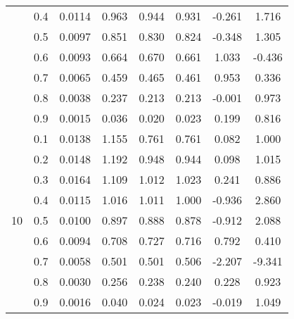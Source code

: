 \documentclass[11pt,a4paper]{report}
\begin{document}
\begin{longtable}{ | c | c || c | c | c | c | c | c | }
 & 0.4 & 0.0114 & 0.963 & 0.944 & 0.931 & -0.261 & 1.716 \\
 & 0.5 & 0.0097 & 0.851 & 0.830 & 0.824 & -0.348 & 1.305 \\
 & 0.6 & 0.0093 & 0.664 & 0.670 & 0.661 & 1.033 & -0.436 \\
 & 0.7 & 0.0065 & 0.459 & 0.465 & 0.461 & 0.953 & 0.336 \\
 & 0.8 & 0.0038 & 0.237 & 0.213 & 0.213 & -0.001 & 0.973 \\
 & 0.9 & 0.0015 & 0.036 & 0.020 & 0.023 & 0.199 & 0.816 \\
 \hline
\multirow{9}{*}{10} & 0.1 & 0.0138 & 1.155 & 0.761 & 0.761 & 0.082 & 1.000 \\
 & 0.2 & 0.0148 & 1.192 & 0.948 & 0.944 & 0.098 & 1.015 \\
 & 0.3 & 0.0164 & 1.109 & 1.012 & 1.023 & 0.241 & 0.886 \\
 & 0.4 & 0.0115 & 1.016 & 1.011 & 1.000 & -0.936 & 2.860 \\
 & 0.5 & 0.0100 & 0.897 & 0.888 & 0.878 & -0.912 & 2.088 \\
 & 0.6 & 0.0094 & 0.708 & 0.727 & 0.716 & 0.792 & 0.410 \\
 & 0.7 & 0.0058 & 0.501 & 0.501 & 0.506 & -2.207 & -9.341 \\
 & 0.8 & 0.0030 & 0.256 & 0.238 & 0.240 & 0.228 & 0.923 \\
 & 0.9 & 0.0016 & 0.040 & 0.024 & 0.023 & -0.019 & 1.049 \\
 \hline
\hline
\end{longtable}
\end{document}
